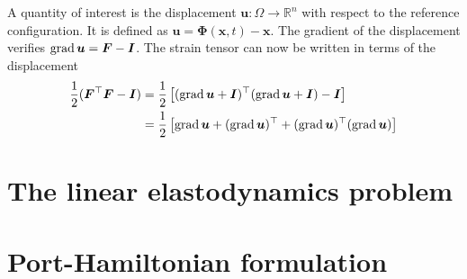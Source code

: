 A quantity of interest is the displacement $\bm{u}: \Omega \rightarrow \mathbb{R}^n$ with respect to the reference configuration. It is defined as $\bm{u} = \bm{\Phi}(\bm{x}, t) - \bm{x}$. The gradient of the displacement verifies $\operatorname*{grad}\bm{u} = \bm{F} - \bm{I}$. The strain tensor can now be written in terms of the displacement
\begin{align*}
	\frac{1}{2} (\bm{F}^\top \bm{F} - \bm{I}) &= \frac{1}{2}\left[(\operatorname*{grad} \bm{u} + \bm{I})^\top (\operatorname*{grad} \bm{u} + \bm{I}) - \bm{I}\right] \\
	&= \frac{1}{2}\left[\operatorname*{grad} \bm{u} + (\operatorname*{grad} \bm{u})^\top + (\operatorname*{grad} \bm{u})^\top (\operatorname*{grad} \bm{u})\right]
\end{align*}



\section{The linear elastodynamics problem}


\section{Port-Hamiltonian formulation}


